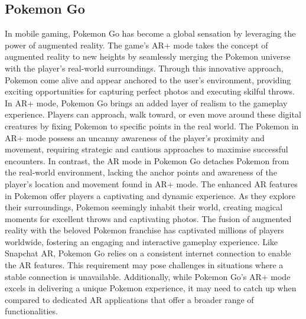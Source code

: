\subsection{Pokemon Go}
In mobile gaming, Pokemon Go has become a global sensation by leveraging the power of augmented reality. The game's AR+ mode takes the concept of augmented reality to new heights by seamlessly merging the Pokemon universe with the player's real-world surroundings. Through this innovative approach, Pokemon come alive and appear anchored to the user's environment, providing exciting opportunities for capturing perfect photos and executing skilful throws.
In AR+ mode, Pokemon Go brings an added layer of realism to the gameplay experience. Players can approach, walk toward, or even move around these digital creatures by fixing Pokemon to specific points in the real world. The Pokemon in AR+ mode possess an uncanny awareness of the player's proximity and movement, requiring strategic and cautious approaches to maximise successful encounters.
In contrast, the AR mode in Pokemon Go detaches Pokemon from the real-world environment, lacking the anchor points and awareness of the player's location and movement found in AR+ mode.
The enhanced AR features in Pokemon offer players a captivating and dynamic experience. As they explore their surroundings, Pokemon seemingly inhabit their world, creating magical moments for excellent throws and captivating photos. The fusion of augmented reality with the beloved Pokemon franchise has captivated millions of players worldwide, fostering an engaging and interactive gameplay experience.
Like Snapchat AR, Pokemon Go relies on a consistent internet connection to enable the AR features. This requirement may pose challenges in situations where a stable connection is unavailable. Additionally, while Pokemon Go's AR+ mode excels in delivering a unique Pokemon experience, it may need to catch up when compared to dedicated AR applications that offer a broader range of functionalities.

